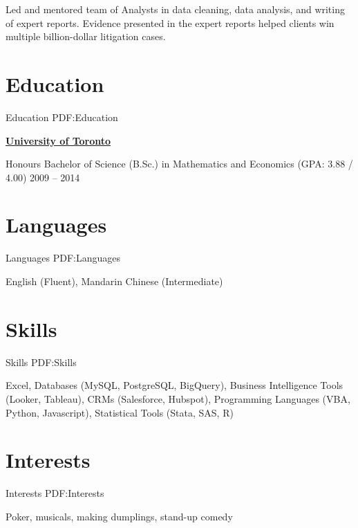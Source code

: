 \documentclass[letterpaper,10pt,oneside]{article}
\begin{document}
\begin{body}
\begin{flushleft}
\BulletItem Led and mentored team of Analysts in data cleaning, data analysis, and writing of expert reports. Evidence presented in the expert reports helped clients win multiple billion-dollar litigation cases.

\end{flushleft}


\section
{Education}
{Education}
{PDF:Education}

\href{https://www.utoronto.ca/}
{\textbf{University of Toronto}}

\GapNoBreak
\BulletItem
Honours Bachelor of Science (B.Sc.) in Mathematics and Economics (GPA: 3.88 / 4.00)
\hfill
2009 -- 2014


\section
{Languages}
{Languages}
{PDF:Languages}

English (Fluent), Mandarin Chinese (Intermediate)


\section
{Skills}
{Skills}
{PDF:Skills}

Excel, Databases (MySQL, PostgreSQL, BigQuery), Business Intelligence Tools (Looker, Tableau), CRMs (Salesforce, Hubspot), Programming Languages (VBA, Python, Javascript), Statistical Tools (Stata, SAS, R)


\section
{Interests}
{Interests}
{PDF:Interests}

Poker, musicals, making dumplings, stand-up comedy

\end{body}
\end{document}
